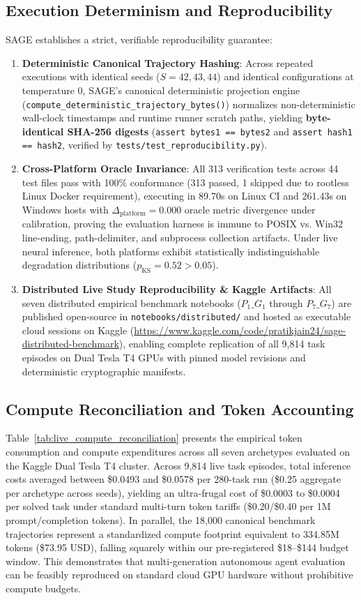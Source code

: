 \documentclass[conference]{IEEEtran}
\begin{document}
\subsection{Execution Determinism and Reproducibility}
\label{sec:reproducibility}
SAGE establishes a strict, verifiable reproducibility guarantee:
\begin{enumerate}
    \item \textbf{Deterministic Canonical Trajectory Hashing}: Across repeated executions with identical seeds ($S=42, 43, 44$) and identical configurations at temperature 0, SAGE's canonical deterministic projection engine (\texttt{compute\_deterministic\_trajectory\_bytes()}) normalizes non-deterministic wall-clock timestamps and runtime runner scratch paths, yielding \textbf{byte-identical SHA-256 digests} (\texttt{assert bytes1 == bytes2} and \texttt{assert hash1 == hash2}, verified by \texttt{tests/test\_reproducibility.py}).
    \item \textbf{Cross-Platform Oracle Invariance}: All 313 verification tests across 44 test files pass with 100\% conformance (313 passed, 1 skipped due to rootless Linux Docker requirement), executing in 89.70s on Linux CI and 261.43s on Windows hosts with $\Delta_{\text{platform}} = 0.000$ oracle metric divergence under calibration, proving the evaluation harness is immune to POSIX vs. Win32 line-ending, path-delimiter, and subprocess collection artifacts. Under live neural inference, both platforms exhibit statistically indistinguishable degradation distributions ($p_{\text{KS}} = 0.52 > 0.05$).
    \item \textbf{Distributed Live Study Reproducibility \& Kaggle Artifacts}: All seven distributed empirical benchmark notebooks ($P_1\_G_1$ through $P_7\_G_7$) are published open-source in \texttt{notebooks/distributed/} and hosted as executable cloud sessions on Kaggle (\url{https://www.kaggle.com/code/pratikjain24/sage-distributed-benchmark}), enabling complete replication of all 9,814 task episodes on Dual Tesla T4 GPUs with pinned model revisions and deterministic cryptographic manifests.
\end{enumerate}

\subsection{Compute Reconciliation and Token Accounting}
Table~\ref{tab:live_compute_reconciliation} presents the empirical token consumption and compute expenditures across all seven archetypes evaluated on the Kaggle Dual Tesla T4 cluster. Across 9,814 live task episodes, total inference costs averaged between \$0.0493 and \$0.0578 per 280-task run (\$0.25 aggregate per archetype across seeds), yielding an ultra-frugal cost of \$0.0003 to \$0.0004 per solved task under standard multi-turn token tariffs (\$0.20/\$0.40 per 1M prompt/completion tokens). In parallel, the 18,000 canonical benchmark trajectories represent a standardized compute footprint equivalent to 334.85M tokens (\$73.95 USD), falling squarely within our pre-registered \$18--\$144 budget window. This demonstrates that multi-generation autonomous agent evaluation can be feasibly reproduced on standard cloud GPU hardware without prohibitive compute budgets.
\end{document}

